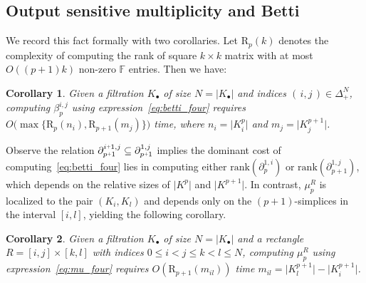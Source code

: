 \documentclass[10pt]{article}
\numberwithin{equation}{section}
\newcommand{\+}{%
	\raisebox{0.18ex}{\scaleobj{0.55}{+}}
}
\newtheorem{corollary}{Corollary}
\theoremstyle{definition}
\theoremstyle{definition}
\begin{document}
\subsection*{Output sensitive multiplicity and Betti}
We record this fact formally with two corollaries. Let $\mathrm{R}_p(k)$ denotes the complexity of computing the rank of square $k \times k$ matrix with at most $O((p+1)k)$ non-zero $\mathbb{F}$ entries. Then we have:
\begin{corollary}
	Given a filtration $K_\bullet$ of size $N = \lvert K_\bullet \rvert$ and indices $(\,i,j\,) \in \Delta_+^N$, computing $\beta_p^{i,j}$ using expression~\eqref{eq:betti_four} requires $O\big(\max \{\mathrm{R}_{p}(n_i), \mathrm{R}_{p+1}(m_j) \} \big)$ time, where $n_i = \lvert K_i^p \rvert$ and $m_j = \lvert K_j^{p+1} \rvert$.
\end{corollary} 
\noindent Observe the relation $\partial_{p\+1}^{i \+ 1, j} \subseteq \partial_{p\+1}^{1, j}$ implies the  dominant cost of computing~\eqref{eq:betti_four} lies in computing either $\mathrm{rank}(\partial_p^{1,i})$ or $\mathrm{rank}(\partial_{p+1}^{1,j})$, which depends on the relative sizes of $\lvert K^p\rvert$ and $\lvert K^{p+1}\rvert$. In contrast, $\mu_p^R$ is localized to the pair $(K_i, K_l)$ and depends only on the $(p+1)$-simplices in the interval $[i, l]$, yielding the following corollary. 
\begin{corollary}
	Given a filtration $K_\bullet$ of size $N = \lvert K_\bullet \rvert$ and a rectangle $R = [i,j] \times [k,l]$ with indices $0 \leq i < j \leq k < l \leq N$, computing $\mu_p^{R}$ using expression~\eqref{eq:mu_four} requires $O(\mathrm{R}_{p+1}(m_{il}))$ time $m_{il} = \lvert K_l^{p+1}\rvert - \lvert K_i^{p+1}\rvert$.
\end{corollary} 
\end{document}
